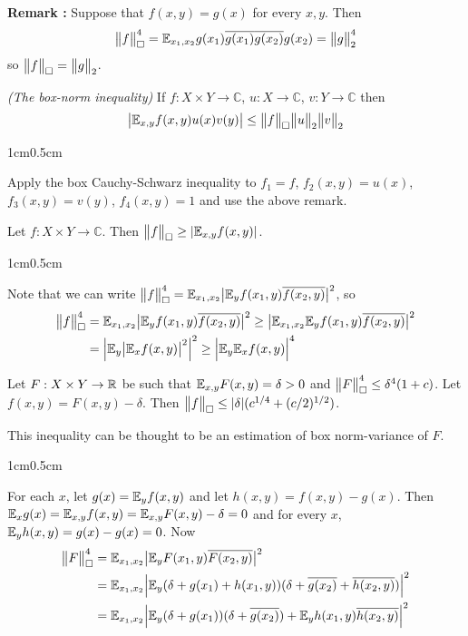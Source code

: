 \documentclass[10pt,a4paper]{report}
\newenvironment{proof}
{\begin{changemargin}{1cm}{0.5cm}
	}%
	{\end{changemargin}
}
\begin{document}
\textbf{Remark :} Suppose that $f(x,y) = g(x)$ for every $x,y$. Then
\begin{align*}
\bigl\lVert f\bigr\rVert_{\tiny{\square}}^4 = \mathbb{E}_{x_1,x_2} g(x_1) \overline{g(x_1)} \overline{g(x_2)} g(x_2) = \bigl\lVert g\bigr\rVert_{2}^4
\end{align*}
so $\bigl\lVert f\bigr\rVert_{\tiny{\square}} = \bigl\lVert g\bigr\rVert_{2}$.
\s

 \emph{(The box-norm inequality)} If $f: X \times Y \rightarrow \mathbb{C}$, $u:X\rightarrow \mathbb{C}$, $v:Y\rightarrow \mathbb{C}$ then
\begin{align*}
\big| \mathbb{E}_{x,y} f(x,y) u(x) v(y) \big| \leq \bigl\lVert f\bigr\rVert_{\tiny{\square}} \bigl\lVert u\bigr\rVert_{2} \bigl\lVert v\bigr\rVert_{2}
\end{align*}
\begin{proof}
\pf Apply the box Cauchy-Schwarz inequality to $f_1=f$, $f_2(x,y) = u(x)$, $f_3(x,y) =v(y)$, $f_4(x,y)=1$ and use the above remark.

\eop
\end{proof}
\s

 Let $f: X\times Y \rightarrow \mathbb{C}$. Then $\bigl\lVert f\bigr\rVert_{\tiny{\square}} \geq |\mathbb{E}_{x,y} f(x,y)|$.
\begin{proof}
\pf Note that we can write $\bigl\lVert f\bigr\rVert_{\tiny{\square}}^4 = \mathbb{E}_{x_1,x_2}  \big| \mathbb{E}_y f(x_1,y) \overline{f(x_2,y)} \big| ^2$, so
\begin{align*}
\bigl\lVert f\bigr\rVert_{\tiny{\square}}^4 &= \mathbb{E}_{x_1,x_2}  \big| \mathbb{E}_y f(x_1,y) \overline{f(x_2,y)} \big| ^2 \geq \big| \mathbb{E}_{x_1,x_2} \mathbb{E}_y f(x_1,y) \overline{f(x_2,y)} \big|^2 \\
&= \Big| \mathbb{E}_y \big| \mathbb{E}_x f(x,y) \big|^2 \Big|^2 \geq \Big| \mathbb{E}_y \mathbb{E}_x f(x,y)   \Big|^4
\end{align*}

\eop
\end{proof}
\s

 Let $F: X\times Y \rightarrow \mathbb{R}$ be such that $\mathbb{E}_{x,y} F(x,y) = \delta >0$ and $\bigl\lVert F\bigr\rVert_{\tiny{\square}}^4 \leq \delta^4 (1+c)$. Let $f(x,y) = F(x,y) - \delta$. Then $\bigl\lVert f\bigr\rVert_{\tiny{\square}} \leq |\delta| (c^{1/4} + (c/2)^{1/2})$.
\s

\quad This inequality can be thought to be an estimation of box norm-variance of $F$.
\begin{proof}
\pf For each $x$, let $g(x) = \mathbb{E}_{y} f(x,y)$ and let $h(x,y)= f(x,y) - g(x)$. Then $\mathbb{E}_x g(x) = \mathbb{E}_{x,y} f(x,y) = \mathbb{E}_{x,y} F(x,y) - \delta =0$ and for every $x$, $\mathbb{E}_{y} h(x,y) = g(x) - g(x) = 0$. Now 
\begin{align*}
\bigl\lVert F\bigr\rVert_{\tiny{\square}}^4 &= \mathbb{E}_{x_1,x_2}  \big| \mathbb{E}_y F(x_1,y) \overline{F(x_2,y)} \big| ^2 \\
&= \mathbb{E}_{x_1,x_2} \Big| \mathbb{E}_y (\delta + g(x_1) + h(x_1,y))(\delta + \overline{g(x_2)} + \overline{h(x_2,y)})\Big|^2 \\
&= \mathbb{E}_{x_1,x_2} \Big| \mathbb{E}_y (\delta + g(x_1))(\delta + \overline{g(x_2)}) + \mathbb{E}_y h(x_1,y) \overline{h(x_2,y)} \Big|^2 \\
\end{align*}
\end{proof}
\s
\end{document}
